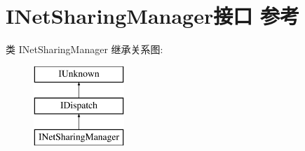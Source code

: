 \hypertarget{interface_i_net_sharing_manager}{}\section{I\+Net\+Sharing\+Manager接口 参考}
\label{interface_i_net_sharing_manager}
类 I\+Net\+Sharing\+Manager 继承关系图\+:\begin{figure}[H]
\begin{center}
\leavevmode
\includegraphics[height=3.000000cm]{interface_i_net_sharing_manager}
\end{center}
\end{figure}
